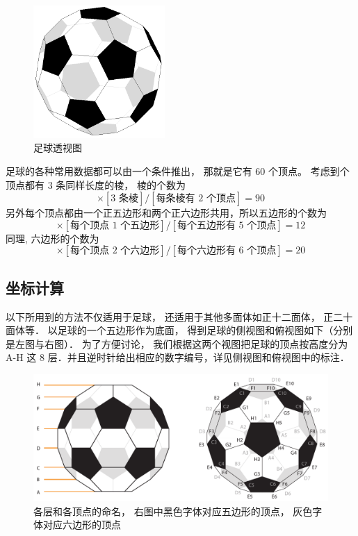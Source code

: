 

\begin{figure}[ht]
\centering
\includegraphics[width=5cm]{./figures/FootBl1.png}
\caption{足球透视图} \label{FootBl_fig1}
\end{figure}

足球的各种常用数据都可以由一个条件推出， 那就是它有 60 个顶点。 考虑到个顶点都有 3 条同样长度的棱， 棱的个数为
\begin{equation}
[\text{60 顶点}] \times [\text{3 条棱}] / [\text{每条棱有 2 个顶点}] = 90
\end{equation}
另外每个顶点都由一个正五边形和两个正六边形共用，所以五边形的个数为
\begin{equation}
[\text{60 顶点}] \times [\text{每个顶点 1 个五边形}] / [\text{每个五边形有 5 个顶点}] = 12
\end{equation}
同理, 六边形的个数为
\begin{equation}
[\text{60 顶点}] \times [\text{每个顶点 2 个六边形}] / [\text{每个六边形有 6 个顶点}] = 20
\end{equation}

\subsection{坐标计算}
以下所用到的方法不仅适用于足球， 还适用于其他多面体如正十二面体， 正二十面体等． 以足球的一个五边形作为底面， 得到足球的侧视图和俯视图如下（分别是左图与右图）． 为了方便讨论， 我们根据这两个视图把足球的顶点按高度分为 A-H 这 8 层．并且逆时针给出相应的数字编号，详见侧视图和俯视图中的标注．

\begin{figure}[ht]
\centering
\includegraphics[width=14cm]{./figures/FootBl2.pdf}
\caption{各层和各顶点的命名， 右图中黑色字体对应五边形的顶点， 灰色字体对应六边形的顶点} \label{FootBl_fig2}
\end{figure}

